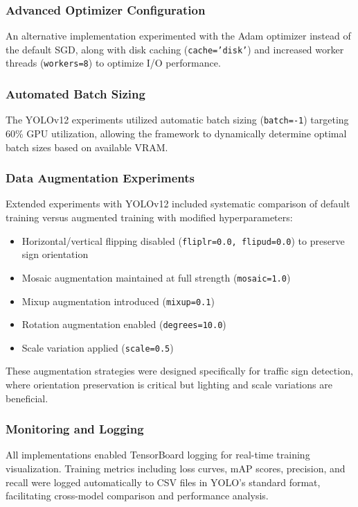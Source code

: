 \documentclass{article}
\begin{document}
\subsubsection*{Advanced Optimizer Configuration}
An alternative implementation experimented with the Adam optimizer instead of the default SGD, along with disk caching (\texttt{cache='disk'}) and increased worker threads (\texttt{workers=8}) to optimize I/O performance.

\subsubsection*{Automated Batch Sizing}
The YOLOv12 experiments utilized automatic batch sizing (\texttt{batch=-1}) targeting 60\% GPU utilization, allowing the framework to dynamically determine optimal batch sizes based on available VRAM.

\subsubsection*{Data Augmentation Experiments}
Extended experiments with YOLOv12 included systematic comparison of default training versus augmented training with modified hyperparameters:
\begin{itemize}
    \item Horizontal/vertical flipping disabled (\texttt{fliplr=0.0, flipud=0.0}) to preserve sign orientation
    \item Mosaic augmentation maintained at full strength (\texttt{mosaic=1.0})
    \item Mixup augmentation introduced (\texttt{mixup=0.1})
    \item Rotation augmentation enabled (\texttt{degrees=10.0})
    \item Scale variation applied (\texttt{scale=0.5})
\end{itemize}

These augmentation strategies were designed specifically for traffic sign detection, where orientation preservation is critical but lighting and scale variations are beneficial.

\subsubsection*{Monitoring and Logging}

All implementations enabled TensorBoard logging for real-time training visualization. Training metrics including loss curves, mAP scores, precision, and recall were logged automatically to CSV files in YOLO's standard format, facilitating cross-model comparison and performance analysis.
\end{document}
